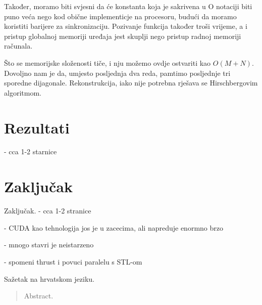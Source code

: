 \documentclass[times, utf8, zavrsni]{fer}
\begin{document}
Također, moramo biti svjesni da će konstanta koja je sakrivena u O
notaciji biti puno veća nego kod obične implementicje na procesoru,
budući da moramo koristiti barijere za sinkronizaciju. Pozivanje
funkcija također troši vrijeme, a i pristup globalnoj memoriji
uređaja jest skuplji nego pristup radnoj memoriji računala. 

Što se memorijske složenosti tiče, i nju možemo ovdje ostvariti
kao $O(M+N)$. Dovoljno nam je da, umjesto posljednja dva reda,
pamtimo posljednje tri sporedne dijagonale. Rekonstrukcija, iako nije potrebna
rješava se Hirschbergovim algoritmom. 





\chapter{Rezultati}
- cca 1-2 starnice







\chapter{Zaključak}
Zaključak.
- cca 1-2 stranice

- CUDA kao tehnologija jos je u zacecima, ali napreduje enormno brzo

- mnogo stavri je neistarzeno

- spomeni thrust i povuci paralelu s STL-om







{}


\begin{sazetak}
Sažetak na hrvatskom jeziku.

\end{sazetak}

\begin{abstract}
Abstract.

\end{abstract}
\end{document}
